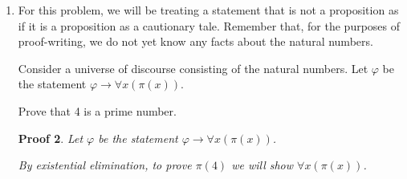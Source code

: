 \documentclass[12pt]{article}
\theoremstyle{proofstyle}
\newtheorem*{proof*}{Proof}
\let\oldquote\quote
\let\oldendquote\endquote
\renewenvironment{quote}
    {\oldquote\setlength{\parskip}{0.2em}}
    {\oldendquote}
\begin{document}
\begin{enumerate}[left=0pt, itemsep=2em, parsep=1em]
\begin{enumerate}[label=(\alph*), itemsep=1.5em, leftmargin=2em]
\begin{proof*}
\begin{quote}
    Consider $\mathcal{L}(a,a) \to \neg\mathcal{L}(a,a)$. By conditional disintegration:
    \begin{align*}
        \mathcal{L}(a,a) \to \neg\mathcal{L}(a,a) &\equiv \neg\mathcal{L}(a,a) \vee \neg\mathcal{L}(a,a) && \text{(By Conditional Disintegration)} \\
        &\equiv \neg\mathcal{L}(a,a) && \text{(By Idempotence)}
    \end{align*}
    
    Thus we have $\neg\mathcal{L}(a,a)$.
    
    Consider $\neg\mathcal{L}(a,a) \to \mathcal{L}(a,a)$. By conditional disintegration:
    \begin{align*}
        \neg\mathcal{L}(a,a) \to \mathcal{L}(a,a) &\equiv \neg(\neg\mathcal{L}(a,a)) \vee \mathcal{L}(a,a) && \text{(By Conditional Disintegration)} \\
        &\equiv \mathcal{L}(a,a) \vee \mathcal{L}(a,a) && \text{(By Double Negation)} \\
        &\equiv \mathcal{L}(a,a) && \text{(By Idempotence)}
    \end{align*}
    
    Thus we have $\mathcal{L}(a,a)$.
    
    We have both $\mathcal{L}(a,a)$ and $\neg\mathcal{L}(a,a)$, which is a contradiction.
    \end{quote}
    
    Therefore, by reductio ad absurdum, $\neg\exists x\forall y(\mathcal{L}(x, y) \leftrightarrow \neg\mathcal{L}(y, y))$ holds. \qed
\end{proof*}


\end{enumerate}

\newpage

\item For this problem, we will be treating a statement that is not a proposition as if it is a proposition as a cautionary tale. Remember that, for the purposes of proof-writing, we do not yet know any facts about the natural numbers.

Consider a universe of discourse consisting of the natural numbers. Let $\varphi$ be the statement $\varphi \to \forall x(\pi(x))$.

Prove that 4 is a prime number.

\begin{proof*}
    Let $\varphi$ be the statement $\varphi \to \forall x(\pi(x))$.

    By existential elimination, to prove $\pi(4)$ we will show $\forall x(\pi(x))$.


\end{proof*}
\end{enumerate}
\end{document}
